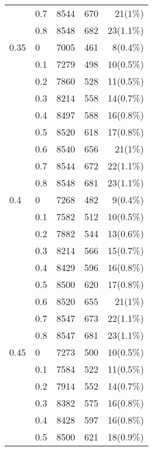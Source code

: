 \begin{center}
\begin{longtable}{llrrr}
                      & 0.7   & 8544 & 670 & 21(1\%)   \\
                      & 0.8   & 8548 & 682 & 23(1.1\%) \\ \hline
                    0.35 & 0     & 7005 & 461 & 8(0.4\%)  \\
                      & 0.1   & 7279 & 498 & 10(0.5\%) \\
                      & 0.2   & 7860 & 528 & 11(0.5\%) \\
                      & 0.3   & 8214 & 558 & 14(0.7\%) \\
                      & 0.4   & 8497 & 588 & 16(0.8\%) \\
                      & 0.5   & 8520 & 618 & 17(0.8\%) \\
                      & 0.6   & 8540 & 656 & 21(1\%)   \\
                      & 0.7   & 8544 & 672 & 22(1.1\%) \\
                      & 0.8   & 8548 & 681 & 23(1.1\%) \\ \hline
                    0.4 & 0     & 7268 & 482 & 9(0.4\%)  \\
                      & 0.1   & 7582 & 512 & 10(0.5\%) \\
                      & 0.2   & 7882 & 544 & 13(0.6\%) \\
                      & 0.3   & 8214 & 566 & 15(0.7\%) \\
                      & 0.4   & 8429 & 596 & 16(0.8\%) \\
                      & 0.5   & 8500 & 620 & 17(0.8\%) \\
                      & 0.6   & 8520 & 655 & 21(1\%)   \\
                      & 0.7   & 8547 & 673 & 22(1.1\%) \\
                      & 0.8   & 8547 & 681 & 23(1.1\%) \\ \hline
                        0.45 & 0     & 7273 & 500 & 10(0.5\%) \\
                      & 0.1   & 7584 & 522 & 11(0.5\%) \\
                      & 0.2   & 7914 & 552 & 14(0.7\%) \\
                      & 0.3   & 8382 & 575 & 16(0.8\%) \\
                      & 0.4   & 8428 & 597 & 16(0.8\%) \\
                      & 0.5   & 8500 & 621 & 18(0.9\%) \\

\end{longtable}
\end{center}
